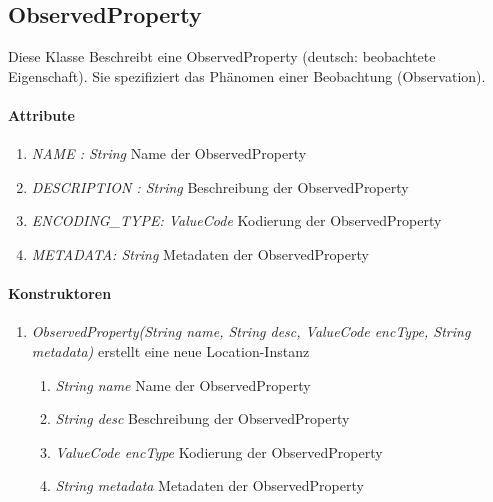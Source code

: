 \subsection*{ObservedProperty}\label{oprop}
Diese Klasse Beschreibt eine ObservedProperty (deutsch: beobachtete Eigenschaft). Sie spezifiziert das Phänomen einer Beobachtung (Observation).

\paragraph{Attribute}
\begin{enumerate}[$\bullet$]
	\item \textit{NAME : String} Name der ObservedProperty
	\item \textit{DESCRIPTION : String} Beschreibung der ObservedProperty
	\item \textit{ENCODING\_TYPE: ValueCode} Kodierung der ObservedProperty
	\item \textit{METADATA: String} Metadaten der ObservedProperty
\end{enumerate}

\paragraph{Konstruktoren}
\begin{enumerate}[+]
	\item \textit{ ObservedProperty(String name, String desc, ValueCode encType, String metadata)}
	erstellt eine neue Location-Instanz
	\begin{enumerate}[$\bullet$]
		\item \textit{String name} Name der ObservedProperty
		\item \textit{String desc} Beschreibung der ObservedProperty
		\item \textit{ValueCode encType} Kodierung der ObservedProperty
		\item \textit{String metadata} Metadaten der ObservedProperty
	\end{enumerate}
	
\end{enumerate}
